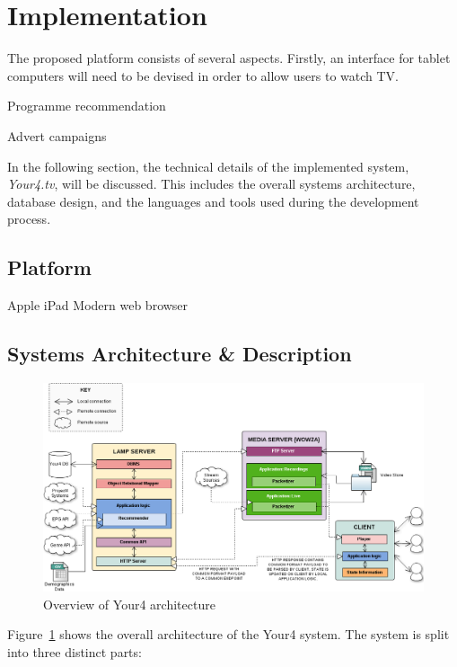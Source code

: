 \section{Implementation}

The proposed platform consists of several aspects. Firstly, an interface for tablet computers will need to be devised in order to allow users to watch TV. 

Programme recommendation

Advert campaigns

In the following section, the technical details of the implemented system, \textit{Your4.tv}, will be discussed. This includes the overall systems architecture, database design, and the languages and tools used during the development process.

\subsection{Platform}

Apple iPad
Modern web browser

\subsection{Systems Architecture \& Description}

\begin{figure}[H]
	\centering
	\includegraphics[width=\textwidth]{images/your4-architecture.png}
	\caption{Overview of Your4 architecture}
	\label{fig:your4-architecture}
\end{figure}

Figure~\ref{fig:your4-architecture} shows the overall architecture of the Your4 system. The system is split into three distinct parts:

